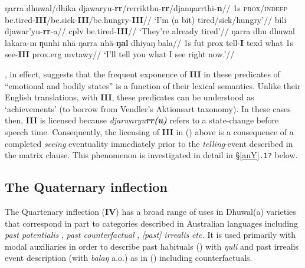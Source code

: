 \pex{}\a\begingl\gla ŋarra dhuwal/dhika djawaryu-\textbf{rr}/rerrikthu-\textbf{rr}/djanŋarrthi-\textbf{n}//
\glb 1s \textsc{prox/indefp} be.tired-\textbf{III}/be.sick-\textbf{III}/be.hungry-\textbf{III}//
\glft`I'm (a bit) tired/sick/hungry'//\endgl
\a\begingl\gla bili djawar'yu-\textbf{rr}-a//
\glb \gls{cplv} be.tired-\textbf{III}//
\glft`They're already tired'//\endgl
{}
\a{}\begingl\gla ŋarra dhu dhuwal lakara-m ƞunhi nhä ŋarra nhä-\textbf{ŋal} dhiyaŋ bala//
\glb 1s \gls{fut} \gls{prox} tell-\textbf{I} \gls{texd} what 1s see-\textbf{III} \gls{prox}.\gls{erg} \gls{mvtawy}//
\glft`I'll tell you what I see right now.'//\endgl
\xe

\citet[365-6]{Wilkinson1991}, in effect, suggests that the frequent exponence of \textbf{III} in these predicates of ``emotional and bodily states'' is a function of their lexical semantics. Unlike their English translations, with \textbf{III}, these predicates can be understood as `achievements' (to borrow from Vendler's Aktionsart taxonomy). In these cases then, \textbf{III} is licensed because \textit{djarwaryu\textbf{rr(u)}} refers to a state-change before speech time. Consequently, the licensing of \textbf{III} in () above is a consequence of a completed \textit{seeing} eventuality immediately prior to the \textit{telling}-event described in the matrix clause. This phenomenon is investigated in detail in §\ref{anY}\texttt{.1?} below.


\subsection{The Quaternary inflection}


The Quartenary inflection (\textbf{IV}) has a broad range of uses in Dhuwal(a) varieties that correspond in part to categories described in Australian languages including \textit{past potentialis} \citep{Heath1980a}, \textit{past counterfactual} \cite{McKay2011}, \textit{[past] irrealis} \citep[159]{Austin1998} \textit{etc.} It is used primarily with modal auxiliaries in order to describe past habituals () with \textit{ŋuli} and past irrealis event description (with \textit{balaŋ} a.o.) as in () including counterfactuals.


